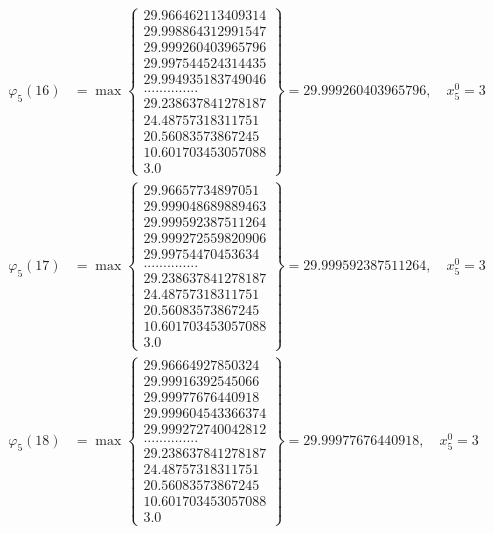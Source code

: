 \documentclass{article}
\begin{document}
\begin{align*}
  
  
  
\varphi_{5}(16) &= \max \left\{ \begin{array}{c}
29.966462113409314 \\
 29.998864312991547 \\
 29.999260403965796 \\
 29.997544524314435 \\
 29.994935183749046 \\
 .............. \\
 29.238637841278187 \\
 24.48757318311751 \\
 20.56083573867245 \\
 10.601703453057088 \\
 3.0
\end{array} \right\} = 29.999260403965796, \quad x_{5}^0 = 3\\
  
  
  
  
\varphi_{5}(17) &= \max \left\{ \begin{array}{c}
29.96657734897051 \\
 29.999048689889463 \\
 29.999592387511264 \\
 29.999272559820906 \\
 29.99754470453634 \\
 .............. \\
 29.238637841278187 \\
 24.48757318311751 \\
 20.56083573867245 \\
 10.601703453057088 \\
 3.0
\end{array} \right\} = 29.999592387511264, \quad x_{5}^0 = 3\\
  
  
  
  
\varphi_{5}(18) &= \max \left\{ \begin{array}{c}
29.96664927850324 \\
 29.99916392545066 \\
 29.99977676440918 \\
 29.999604543366374 \\
 29.999272740042812 \\
 .............. \\
 29.238637841278187 \\
 24.48757318311751 \\
 20.56083573867245 \\
 10.601703453057088 \\
 3.0
\end{array} \right\} = 29.99977676440918, \quad x_{5}^0 = 3\\
  

\end{align*}
\end{document}
